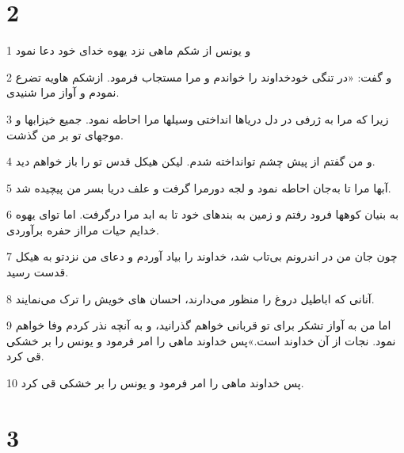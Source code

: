 \chapter{2}

\par 1 و یونس از شکم ماهی نزد یهوه خدای خود دعا نمود
\par 2 و گفت: «در تنگی خودخداوند را خواندم و مرا مستجاب فرمود. ازشکم هاویه تضرع نمودم و آواز مرا شنیدی.
\par 3 زیرا که مرا به ژرفی در دل دریاها انداختی وسیلها مرا احاطه نمود. جمیع خیزابها و موجهای تو بر من گذشت.
\par 4 و من گفتم از پیش چشم توانداخته شدم. لیکن هیکل قدس تو را باز خواهم دید.
\par 5 آبها مرا تا به‌جان احاطه نمود و لجه دورمرا گرفت و علف دریا بسر من پیچیده شد.
\par 6 به بنیان کوهها فرود رفتم و زمین به بندهای خود تا به ابد مرا در‌گرفت. اما تو‌ای یهوه خدایم حیات مرااز حفره برآوردی.
\par 7 چون جان من در اندرونم بی‌تاب شد، خداوند را بیاد آوردم و دعای من نزدتو به هیکل قدست رسید.
\par 8 آنانی که اباطیل دروغ را منظور می‌دارند، احسان های خویش را ترک می‌نمایند.
\par 9 اما من به آواز تشکر برای تو قربانی خواهم گذرانید، و به آنچه نذر کردم وفا خواهم نمود. نجات از آن خداوند است.»پس خداوند ماهی را امر فرمود و یونس را بر خشکی قی کرد.
\par 10 پس خداوند ماهی را امر فرمود و یونس را بر خشکی قی کرد.

\chapter{3}

